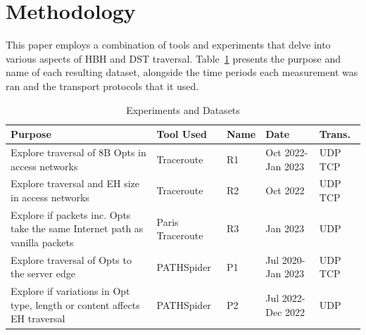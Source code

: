 \documentclass[conference]{IEEEtran}
\begin{document}







\section{Methodology} 
\label{sec:methodology}

This paper employs a combination of tools and experiments that
delve into various aspects of HBH and DST traversal. Table~\ref{tbl:datasets} presents the purpose and name of each resulting dataset, alongside the time periods each measurement was ran and the transport protocols that it used.

\begin{table}
\begin{tabular}{p{}|p{}|p{}|p{}|p{}}
Purpose                                                                          & Tool Used        & Name & Date               & Trans. \\
\hline
Explore traversal of 8B Opts in access networks                                  & Traceroute       & R1           & Oct 2022- Jan 2023 & UDP TCP          \\
\hline
Explore traversal and EH size in access networks                                & Traceroute       & R2           & Oct 2022           & UDP TCP          \\
\hline
Explore if packets inc. Opts take the same Internet path as vanilla packets & Paris Traceroute & R3           & Jan 2023           & UDP               \\
\hline
Explore traversal of Opts to the server edge                              & PATHSpider       & P1           & Jul 2020- Jan 2023 & UDP TCP          \\
\hline
Explore if variations in Opt type, length or content affects EH traversal   & PATHSpider       & P2           & Jul 2022- Dec 2022     & UDP              
\end{tabular}
  \caption{Experiments and Datasets}
  \label{tbl:datasets}
\end{table}
\end{document}
